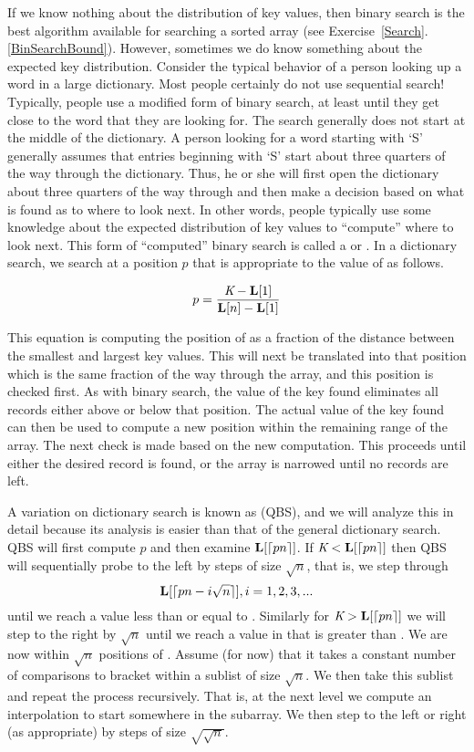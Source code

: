 If we know nothing about the distribution of
key values, then binary search is the best
algorithm available for searching a sorted array
(see Exercise~\ref{Search}.\ref{BinSearchBound}).
However, sometimes we do know something about the expected
key distribution.
Consider the typical behavior of a person looking up a word in
a large dictionary.
Most people certainly do not use sequential search!
Typically, people use a modified form of binary search, at least until
they get close to the word that they are looking for.
The search generally does not start at the middle of the dictionary.
A person looking for a word starting with `S'
generally assumes that entries beginning with `S' start about three
quarters  of the way through the dictionary.
Thus, he or she will first open the dictionary about three quarters of
the way through and then make a decision based on what is found as to
where to look next.
In other words, people typically use some knowledge about the
expected distribution of key values to ``compute'' where to look next.
This form of ``computed'' binary search is called a
 or .
In a dictionary search, we search  at a position \(p\) that is
appropriate to the value of  as follows.

\[p = \frac{{\textit{K}} - {\textbf{L}}[1]}{{\textbf{L}}[n] - {\textbf{L}}[1]}\]

This equation is computing the position of  as a fraction of
the distance between the smallest and largest key values.
This will next be translated into that position which is the same
fraction of the way through the array,
and this position is checked first.
As with binary search, the value of the key found eliminates
all records either above or below that position.
The actual value of the key found can then be used to
compute a new position within the remaining range of the array.
The next check is made based on the new computation.
This proceeds until either the desired record is found, or the array
is narrowed until no records are left.

A variation on dictionary search is known as 
 (QBS),
and we will analyze this in detail because its analysis is easier than
that of the general dictionary search.
QBS will first compute \(p\) and then examine
\({\textbf{L}}[\lceil pn\rceil]\).
If \({\textit{K}} < {\textbf{L}}[\lceil pn\rceil]\) then QBS will sequentially
probe to the left by steps of size \(\sqrt{n}\), that is, we step
through
\[{\textbf{L}}[\lceil pn - i\sqrt{n}\rceil], i = 1, 2, 3, ...\]
until we reach a value less than or equal to .
Similarly for \({\textit{K}} > {\textbf{L}}[\lceil pn\rceil]\)
we will step to the right by \(\sqrt{n}\) until we reach a value in
 that is greater than .
We are now within \(\sqrt{n}\) positions of .
Assume (for now) that it takes a constant number of comparisons to
bracket  within a sublist of size \(\sqrt{n}\).
We then take this sublist and repeat the process recursively.
That is, at the next level we compute an interpolation to start
somewhere in the subarray.
We then step to the left or right (as appropriate) by steps of size
\(\sqrt{\sqrt{n}}\).

